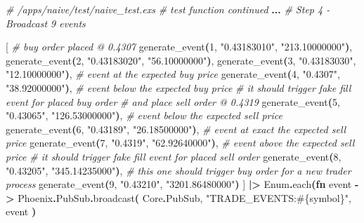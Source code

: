 \documentclass[
  oneside]{book}
\newenvironment{Shaded}{\begin{snugshade}}{\end{snugshade}}
\newcommand{\CommentTok}[1]{\textcolor[rgb]{0.56,0.35,0.01}{\textit{#1}}}
\newcommand{\ConstantTok}[1]{\textcolor[rgb]{0.56,0.35,0.01}{#1}}
\newcommand{\DecValTok}[1]{\textcolor[rgb]{0.00,0.00,0.81}{#1}}
\newcommand{\FunctionTok}[1]{\textcolor[rgb]{0.13,0.29,0.53}{\textbf{#1}}}
\newcommand{\KeywordTok}[1]{\textcolor[rgb]{0.13,0.29,0.53}{\textbf{#1}}}
\newcommand{\NormalTok}[1]{#1}
\newcommand{\OperatorTok}[1]{\textcolor[rgb]{0.81,0.36,0.00}{\textbf{#1}}}
\newcommand{\OtherTok}[1]{\textcolor[rgb]{0.56,0.35,0.01}{#1}}
\newcommand{\StringTok}[1]{\textcolor[rgb]{0.31,0.60,0.02}{#1}}
\begin{document}
\begin{Shaded}
\begin{Highlighting}[]
    \CommentTok{\# /apps/naive/test/naive\_test.exs}
    \CommentTok{\# \textasciigrave{}test\textasciigrave{} function continued}
    \OperatorTok{...}
    \CommentTok{\# Step 4 {-} Broadcast 9 events}

    \OtherTok{[}
      \CommentTok{\# buy order placed @ 0.4307}
\NormalTok{      generate\_event}\FunctionTok{(}\DecValTok{1}\NormalTok{, }\StringTok{"0.43183010"}\NormalTok{, }\StringTok{"213.10000000"}\FunctionTok{)}\NormalTok{,}
\NormalTok{      generate\_event}\FunctionTok{(}\DecValTok{2}\NormalTok{, }\StringTok{"0.43183020"}\NormalTok{, }\StringTok{"56.10000000"}\FunctionTok{)}\NormalTok{,}
\NormalTok{      generate\_event}\FunctionTok{(}\DecValTok{3}\NormalTok{, }\StringTok{"0.43183030"}\NormalTok{, }\StringTok{"12.10000000"}\FunctionTok{)}\NormalTok{,}
      \CommentTok{\# event at the expected buy price}
\NormalTok{      generate\_event}\FunctionTok{(}\DecValTok{4}\NormalTok{, }\StringTok{"0.4307"}\NormalTok{, }\StringTok{"38.92000000"}\FunctionTok{)}\NormalTok{,}
      \CommentTok{\# event below the expected buy price}
      \CommentTok{\# it should trigger fake fill event for placed buy order}
      \CommentTok{\# and place sell order @ 0.4319}
\NormalTok{      generate\_event}\FunctionTok{(}\DecValTok{5}\NormalTok{, }\StringTok{"0.43065"}\NormalTok{, }\StringTok{"126.53000000"}\FunctionTok{)}\NormalTok{,}
      \CommentTok{\# event below the expected sell price}
\NormalTok{      generate\_event}\FunctionTok{(}\DecValTok{6}\NormalTok{, }\StringTok{"0.43189"}\NormalTok{, }\StringTok{"26.18500000"}\FunctionTok{)}\NormalTok{,}
      \CommentTok{\# event at exact the expected sell price}
\NormalTok{      generate\_event}\FunctionTok{(}\DecValTok{7}\NormalTok{, }\StringTok{"0.4319"}\NormalTok{, }\StringTok{"62.92640000"}\FunctionTok{)}\NormalTok{,}
      \CommentTok{\# event above the expected sell price}
      \CommentTok{\# it should trigger fake fill event for placed sell order}
\NormalTok{      generate\_event}\FunctionTok{(}\DecValTok{8}\NormalTok{, }\StringTok{"0.43205"}\NormalTok{, }\StringTok{"345.14235000"}\FunctionTok{)}\NormalTok{,}
      \CommentTok{\# this one should trigger buy order for a new trader process}
\NormalTok{      generate\_event}\FunctionTok{(}\DecValTok{9}\NormalTok{, }\StringTok{"0.43210"}\NormalTok{, }\StringTok{"3201.86480000"}\FunctionTok{)}
    \OtherTok{]}
    \OperatorTok{|\textgreater{}} \ConstantTok{Enum}\OperatorTok{.}\NormalTok{each}\FunctionTok{(}\KeywordTok{fn}\NormalTok{ event }\OperatorTok{{-}\textgreater{}}
      \ConstantTok{Phoenix}\OperatorTok{.}\ConstantTok{PubSub}\OperatorTok{.}\NormalTok{broadcast}\FunctionTok{(}
        \ConstantTok{Core}\OperatorTok{.}\ConstantTok{PubSub}\NormalTok{,}
        \StringTok{"TRADE\_EVENTS:}\OtherTok{\#\{}\NormalTok{symbol}\OtherTok{\}}\StringTok{"}\NormalTok{,}
\NormalTok{        event}
      \FunctionTok{)}


\end{Highlighting}
\end{Shaded}
\end{document}
